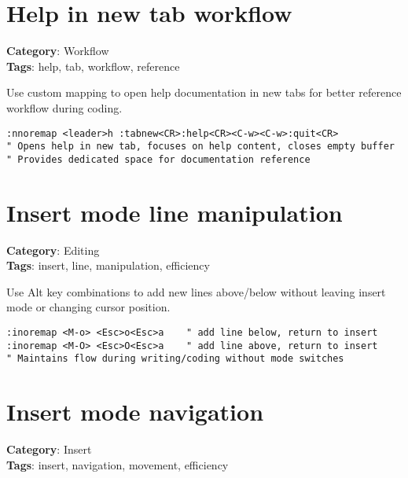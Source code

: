 {{{\section{Help in new tab workflow}

\textbf{Category}: Workflow\\ \textbf{Tags}: help, tab, workflow, reference
\vspace{0.5cm}

Use custom mapping to open help documentation in new tabs for better reference workflow during coding.

\begin{Exa*}{}
\begin{Verbatim}[fontsize=\footnotesize, breaklines, breakanywhere]
:nnoremap <leader>h :tabnew<CR>:help<CR><C-w><C-w>:quit<CR>
" Opens help in new tab, focuses on help content, closes empty buffer
" Provides dedicated space for documentation reference
\end{Verbatim}
\end{Exa*}

\section{Insert mode line manipulation}

\textbf{Category}: Editing\\ \textbf{Tags}: insert, line, manipulation, efficiency
\vspace{0.5cm}

Use Alt key combinations to add new lines above/below without leaving insert mode or changing cursor position.

\begin{Exa*}{}
\begin{Verbatim}[fontsize=\footnotesize, breaklines, breakanywhere]
:inoremap <M-o> <Esc>o<Esc>a    " add line below, return to insert
:inoremap <M-O> <Esc>O<Esc>a    " add line above, return to insert
" Maintains flow during writing/coding without mode switches
\end{Verbatim}
\end{Exa*}

\section{Insert mode navigation}

\textbf{Category}: Insert\\ \textbf{Tags}: insert, navigation, movement, efficiency
\vspace{0.5cm}

}}}
